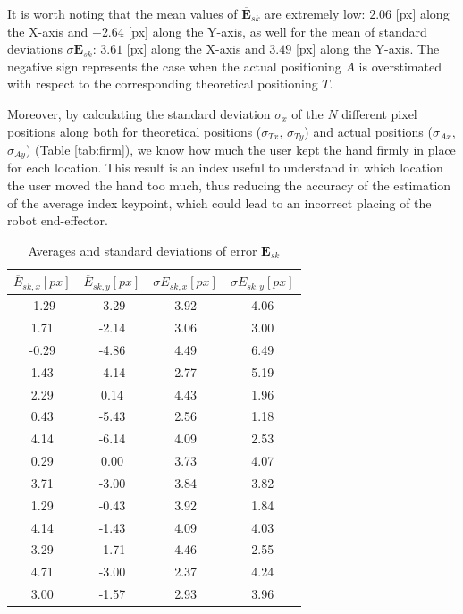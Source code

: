 \documentclass[a4paper, 10pt, conference]{ieeeconf}      %
\begin{document}
It is worth noting that the mean values of $\overline{\mathbf{E}}_{sk}$ are extremely low: $2.06$ [px] along the X-axis and $-2.64$ [px] along the Y-axis, as well for the mean of standard deviations $\sigma{\mathbf{E}}_{sk}$: $3.61$ [px] along the X-axis and $3.49$ [px] along the Y-axis. The negative sign represents the case when the actual positioning $A$ is overstimated with respect to the corresponding theoretical positioning $T$.

Moreover, by calculating the standard deviation $\sigma_x$ of the $N$ different pixel positions along both for theoretical positions ($\sigma_{Tx}$, $\sigma_{Ty}$) and actual positions ($\sigma_{Ax}$, $\sigma_{Ay}$) (Table \ref{tab:firm}), we know how much the user kept the hand firmly in place for each location. This result is an index useful to understand in which location the user moved the hand too much, thus reducing the accuracy of the estimation of the average index keypoint, which could lead to an incorrect placing of the robot end-effector.

\begin{table}[h]
\begin{center}
\caption{Averages and standard deviations of error $\mathbf{E}_{sk}$}
\label{tab:dev}
\begin{tabular}{|c||c||c||c|}
\hline
$\overline{E}_{sk,x} [px]$ & $\overline{E}_{sk,y} [px]$ & $\sigma{E}_{sk,x} [px]$ & $\sigma{E}_{sk,y} [px]$\\
\hline
-1.29	&	-3.29	&	3.92	&	4.06	\\
1.71	&	-2.14	&	3.06	&	3.00	\\
-0.29	&	-4.86	&	4.49	&	6.49	\\
1.43	&	-4.14	&	2.77	&	5.19	\\
2.29	&	0.14	&	4.43	&	1.96	\\
0.43	&	-5.43	&	2.56	&	1.18	\\
4.14	&	-6.14	&	4.09	&	2.53	\\
0.29	&	0.00	&	3.73	&	4.07	\\
3.71	&	-3.00	&	3.84	&	3.82	\\
1.29	&	-0.43	&	3.92	&	1.84	\\
4.14	&	-1.43	&	4.09	&	4.03	\\
3.29	&	-1.71	&	4.46	&	2.55	\\
4.71	&	-3.00	&	2.37	&	4.24	\\
3.00	&	-1.57	&	2.93	&	3.96	\\
\hline
\end{tabular}
\end{center}
\end{table}
\end{document}
